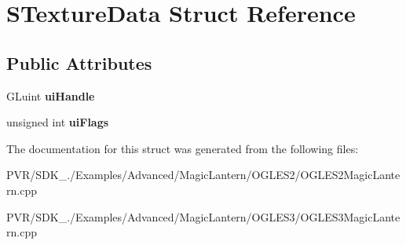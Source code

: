 \hypertarget{struct_s_texture_data}{\section{S\+Texture\+Data Struct Reference}
\label{struct_s_texture_data}
}
\subsection*{Public Attributes}
\begin{DoxyCompactItemize}
\item 
\hypertarget{struct_s_texture_data_ae72d836a8dfb23a4bad4768b187b6502}{G\+Luint {\bfseries ui\+Handle}}\label{struct_s_texture_data_ae72d836a8dfb23a4bad4768b187b6502}

\item 
\hypertarget{struct_s_texture_data_a4982d2612cb0d7bd29ea688b2c59ee5d}{unsigned int {\bfseries ui\+Flags}}\label{struct_s_texture_data_a4982d2612cb0d7bd29ea688b2c59ee5d}

\end{DoxyCompactItemize}


The documentation for this struct was generated from the following files\+:\begin{DoxyCompactItemize}
\item 
P\+V\+R/\+S\+D\+K\+\_./\+Examples/\+Advanced/\+Magic\+Lantern/\+O\+G\+L\+E\+S2/O\+G\+L\+E\+S2\+Magic\+Lantern.\+cpp\item 
P\+V\+R/\+S\+D\+K\+\_./\+Examples/\+Advanced/\+Magic\+Lantern/\+O\+G\+L\+E\+S3/O\+G\+L\+E\+S3\+Magic\+Lantern.\+cpp\end{DoxyCompactItemize}
